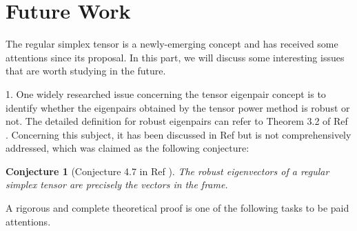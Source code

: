 \documentclass{elsarticle}
\newtheorem{conjecture}{\textbf{Conjecture} }
\begin{document}
\section{Future Work}\label{futurework}
The regular simplex tensor
is a  newly-emerging 
concept and has received  some  attentions since its proposal.   
In  this part, we  will  discuss  some  interesting issues that are worth studying in the future.



1. 
One widely researched issue concerning the tensor eigenpair concept
is 
to identify whether the  eigenpairs  obtained by the tensor power method  is  robust or not. 
The detailed definition for robust eigenpairs can refer to Theorem 3.2 of Ref  \cite{RobustEigen}.
Concerning this subject, it has been discussed in  Ref  \cite{RobustEigen}
but is not comprehensively 
addressed,
which was claimed as the following conjecture:
	\begin{conjecture}[Conjecture 4.7 in  Ref  \cite{RobustEigen} ] \label{conjecturesimplex}
	The robust eigenvectors of a regular simplex tensor   are precisely the
	vectors in the frame.
\end{conjecture}
A rigorous and  complete   theoretical proof  is  one of the  following  tasks to be paid attentions. 

\end{document}
